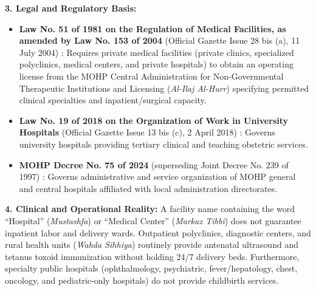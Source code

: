 \documentclass[10pt,a4paper]{article}
\begin{document}
\textbf{3. Legal and Regulatory Basis:}
\begin{itemize}
    \item \textbf{Law No. 51 of 1981 on the Regulation of Medical Facilities, as amended by Law No. 153 of 2004} (Official Gazette Issue 28 bis (a), 11 July 2004) \cite{egypt_law_51_1981_153_2004}: Requires private medical facilities (private clinics, specialized polyclinics, medical centers, and private hospitals) to obtain an operating license from the MOHP Central Administration for Non-Governmental Therapeutic Institutions and Licensing (\textit{Al-Ilaj Al-Hurr}) specifying permitted clinical specialties and inpatient/surgical capacity.
    \item \textbf{Law No. 19 of 2018 on the Organization of Work in University Hospitals} (Official Gazette Issue 13 bis (c), 2 April 2018) \cite{egypt_law_19_2018_univ}: Governs university hospitals providing tertiary clinical and teaching obstetric services.
    \item \textbf{MOHP Decree No. 75 of 2024} (superseding Joint Decree No. 239 of 1997) \cite{egypt_mohp_decree_75_2024}: Governs administrative and service organization of MOHP general and central hospitals affiliated with local administration directorates.
\end{itemize}

\textbf{4. Clinical and Operational Reality:}
A facility name containing the word ``Hospital'' (\textit{Mustashfa}) or ``Medical Center'' (\textit{Markaz Tibbi}) does not guarantee inpatient labor and delivery wards. Outpatient polyclinics, diagnostic centers, and rural health units (\textit{Wahda Sihhiya}) routinely provide antenatal ultrasound and tetanus toxoid immunization without holding 24/7 delivery beds. Furthermore, specialty public hospitals (ophthalmology, psychiatric, fever/hepatology, chest, oncology, and pediatric-only hospitals) do not provide childbirth services.
\end{document}
